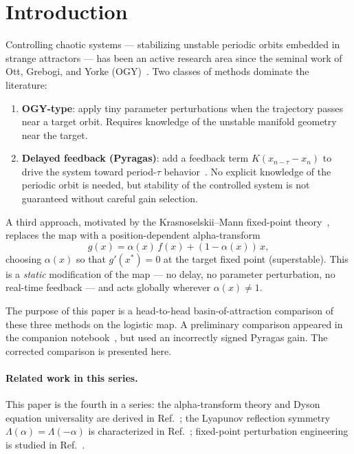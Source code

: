 \documentclass[aps,pre,twocolumn,superscriptaddress,nofootinbib,
               longbibliography,floatfix]{revtex4-2}
\newcommand{\KM}{Krasnoselskii--Mann}
\newcommand{\Lam}{\Lambda}
\begin{document}
\section{Introduction}
\label{sec:intro}

Controlling chaotic systems — stabilizing unstable periodic
orbits embedded in strange attractors — has been an active
research area since the seminal work of Ott, Grebogi, and Yorke
(OGY)~\cite{OttGrebogiYorke1990}.
Two classes of methods dominate the literature:

\begin{enumerate}
  \item \textbf{OGY-type}: apply tiny parameter perturbations
    when the trajectory passes near a target orbit.
    Requires knowledge of the unstable manifold geometry near
    the target.
  \item \textbf{Delayed feedback (Pyragas)}: add a feedback
    term $K(x_{n-\tau} - x_n)$ to drive the system toward
    period-$\tau$ behavior~\cite{Pyragas1992}.
    No explicit knowledge of the periodic orbit is needed, but
    stability of the controlled system is not guaranteed without
    careful gain selection.
\end{enumerate}

A third approach, motivated by the \KM{} fixed-point
theory~\cite{Krasnoselskii1955,Mann1953}, replaces the map with
a position-dependent alpha-transform
%
\begin{equation}
  g(x) = \alpha(x)\,f(x) + (1 - \alpha(x))\,x,
  \label{eq:alpha-map}
\end{equation}
%
choosing $\alpha(x)$ so that $g'(x^*) = 0$ at the target fixed
point (superstable).
This is a \emph{static} modification of the map — no delay,
no parameter perturbation, no real-time feedback — and acts
globally wherever $\alpha(x) \neq 1$.

The purpose of this paper is a head-to-head basin-of-attraction
comparison of these three methods on the logistic map.
A preliminary comparison appeared in the companion
notebook~\cite{PetrificationRepo}, but used an incorrectly
signed Pyragas gain.
The corrected comparison is presented here.

\paragraph{Related work in this series.}
This paper is the fourth in a series: the alpha-transform
theory and Dyson equation universality are derived in
Ref.~\cite{DysonPaper}; the Lyapunov reflection symmetry
$\Lam(\alpha) = \Lam(-\alpha)$ is characterized in
Ref.~\cite{Z2Paper}; fixed-point perturbation engineering is
studied in Ref.~\cite{PertPaper}.
\end{document}
